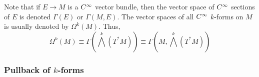 Note that if \(E \rightarrow M\) is a \(C^\infty\) vector bundle, then the vector space of \(C^\infty\) sections of \(E\) is denoted \(\Gamma(E)\) or \(\Gamma(M,E)\).
The vector spaces of all \(C^\infty\) \(k\)-forms on \(M\) is usually denoted by \(\Omega^k(M)\).
Thus,
\[
    \Omega^k(M) \equiv \Gamma(\bigwedge^k (T^* M)) \equiv \Gamma(M, \bigwedge^k (T^* M))   
\]

\subsubsection{Pullback of \(k\)-forms}
